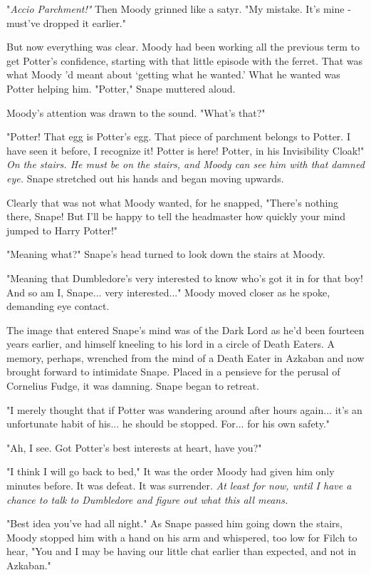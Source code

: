 "\emph{Accio Parchment!"} Then Moody grinned like a satyr. "My mistake. It's mine - must've dropped it earlier."

But now everything was clear. Moody had been working all the previous term to get Potter's confidence, starting with that little episode with the ferret. That was what Moody 'd meant about `getting what he wanted.' What he wanted was Potter helping him. "Potter," Snape muttered aloud.

Moody's attention was drawn to the sound. "What's that?"

"Potter! That egg is Potter's egg. That piece of parchment belongs to Potter. I have seen it before, I recognize it! Potter is here! Potter, in his Invisibility Cloak!" \emph{On the stairs. He must be on the stairs, and Moody can see him with that damned eye.} Snape stretched out his hands and began moving upwards.

Clearly that was not what Moody wanted, for he snapped, "There's nothing there, Snape! But I'll be happy to tell the headmaster how quickly your mind jumped to Harry Potter!"

"Meaning what?" Snape's head turned to look down the stairs at Moody.

"Meaning that Dumbledore's very interested to know who's got it in for that boy! And so am I, Snape... very interested..." Moody moved closer as he spoke, demanding eye contact.

The image that entered Snape's mind was of the Dark Lord as he'd been fourteen years earlier, and himself kneeling to his lord in a circle of Death Eaters. A memory, perhaps, wrenched from the mind of a Death Eater in Azkaban and now brought forward to intimidate Snape. Placed in a pensieve for the perusal of Cornelius Fudge, it was damning. Snape began to retreat.

"I merely thought that if Potter was wandering around after hours again... it's an unfortunate habit of his... he should be stopped. For... for his own safety."

"Ah, I see. Got Potter's best interests at heart, have you?"

"I think I will go back to bed," It was the order Moody had given him only minutes before. It was defeat. It was surrender. \emph{At least for now, until I have a chance to talk to Dumbledore and figure out what this all means.}

"Best idea you've had all night." As Snape passed him going down the stairs, Moody stopped him with a hand on his arm and whispered, too low for Filch to hear, "You and I may be having our little chat earlier than expected, and not in Azkaban."


